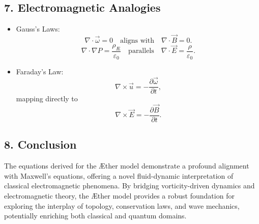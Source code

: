         \subsection*{7. Electromagnetic Analogies}
        \begin{itemize}
            \item Gauss's Laws:
            \begin{equation*}
                \nabla \cdot \vec{\omega} = 0 \quad \text{aligns with} \quad \nabla \cdot \vec{B} = 0.
            \end{equation*}
            \begin{equation*}
                \nabla \cdot \nabla P = \frac{\rho_\text{Æ}}{\varepsilon_0} \quad \text{parallels} \quad \nabla \cdot \vec{E} = \frac{\rho}{\varepsilon_0}.
            \end{equation*}
            \item Faraday's Law:
            \begin{equation*}
                \nabla \times \vec{u} = -\frac{\partial \vec{\omega}}{\partial t},
            \end{equation*}
            mapping directly to
            \begin{equation*}
                \nabla \times \vec{E} = -\frac{\partial \vec{B}}{\partial t}.
            \end{equation*}
        \end{itemize}

        \subsection*{8. Conclusion}
        The equations derived for the Æther model demonstrate a profound alignment with Maxwell's equations, offering a novel fluid-dynamic interpretation of classical electromagnetic phenomena. By bridging vorticity-driven dynamics and electromagnetic theory, the Æther model provides a robust foundation for exploring the interplay of topology, conservation laws, and wave mechanics, potentially enriching both classical and quantum domains.